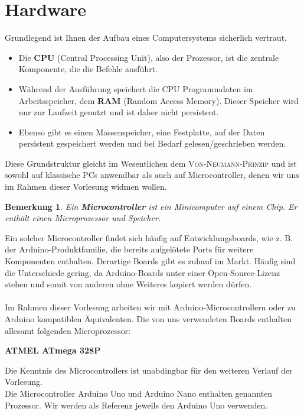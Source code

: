 \documentclass[11pt,a4paper]{scrartcl}
\newtheorem{note}{Bemerkung}
\begin{document}
\section{Hardware}
Grundlegend ist Ihnen der Aufbau eines Computersystems sicherlich vertraut.
\begin{itemize}
\item Die \textbf{CPU} (Central Processing Unit), also der Prozessor, ist die zentrale Komponente, die die Befehle ausführt.
\item Während der Ausführung speichert die CPU Programmdaten im Arbeitsspeicher, dem \textbf{RAM} (Random Access Memory). Dieser Speicher wird nur zur Laufzeit genutzt und ist daher nicht persistent.
\item Ebenso gibt es einen Massenspeicher, eine Festplatte, auf der Daten persistent gespeichert werden und bei Bedarf gelesen/geschrieben werden.
\end{itemize}
Diese Grundstruktur gleicht im Wesentlichen dem \textsc{Von-Neumann-Prinzip} und ist sowohl auf klassische PCs anwendbar als auch auf Microcontroller, denen wir uns im Rahmen dieser Vorlesung widmen wollen.
\\
\begin{note}
Ein \textbf{Microcontroller} ist ein Minicomputer auf einem Chip. Er enthält einen Microprozessor und Speicher.
\end{note}
Ein solcher Microcontroller findet sich häufig auf Entwicklungsboards, wie z. B. der Arduino-Produktfamilie, die bereits aufgelötete Ports für weitere Komponenten enthalten. Derartige Boards gibt es zuhauf im Markt. Häufig sind die Unterschiede gering, da Arduino-Boards unter einer Open-Source-Lizenz stehen und somit von anderen ohne Weiteres kopiert werden dürfen. \\\\
Im Rahmen dieser Vorlesung arbeiten wir mit Arduino-Microcontrollern oder zu Arduino kompatiblen Äquivalenten. Die von uns verwendeten Boards enthalten allesamt folgenden Microprozessor:
\begin{center}
\textbf{ATMEL ATmega 328P}
\end{center}
Die Kenntnis des Microcontrollers ist unabdingbar für den weiteren Verlauf der Vorlesung. \\
Die Microcontroller Arduino Uno und Arduino Nano enthalten genannten Prozessor. Wir werden als Referenz jeweils den Arduino Uno verwenden.
\end{document}
